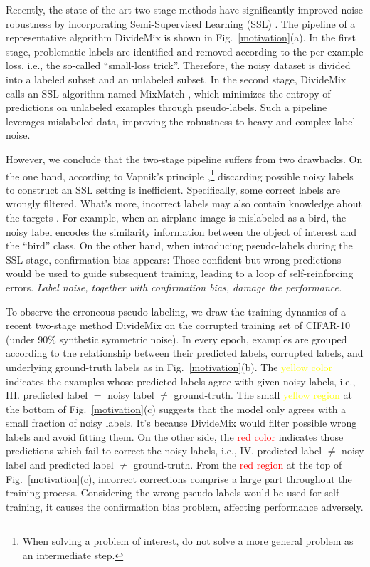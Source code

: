 \documentclass[letterpaper]{article} \usepackage{aaai23}  \usepackage{times}  \usepackage{helvet}  \usepackage{courier}  \usepackage[hyphens]{url}  \usepackage{graphicx} \urlstyle{rm} \def\UrlFont{\rm}  \usepackage{natbib}  \usepackage{caption} \frenchspacing  \setlength{\pdfpagewidth}{8.5in} \setlength{\pdfpageheight}{11in} \usepackage{algorithm}
\begin{document}
Recently, the state-of-the-art two-stage methods have significantly improved noise robustness by incorporating Semi-Supervised Learning (SSL) \cite{ding2018semi,nguyen2019self,li2020dividemix,zhou2021robust}.
The pipeline of a representative algorithm DivideMix \cite{li2020dividemix} is shown in Fig.~\ref{motivation}(a). 
In the first stage, problematic labels are identified and removed according to the per-example loss, i.e., the so-called  ``small-loss trick''.
Therefore, the noisy dataset is divided into a labeled subset and an unlabeled subset. 
In the second stage, DivideMix calls an SSL algorithm named MixMatch \cite{berthelot2019mixmatch}, which minimizes the entropy of predictions on unlabeled examples through pseudo-labels.
Such a pipeline leverages mislabeled data, improving the robustness to heavy and complex label noise.

However, we conclude that the two-stage pipeline suffers from two drawbacks.
On the one hand, according to Vapnik's principle \cite{Vapnik1998,Chapelle2006},\footnote{When solving a problem of interest, do not solve a more general problem as an intermediate step.} discarding possible noisy labels to construct an SSL setting is inefficient. 
Specifically, some correct labels are wrongly filtered. What's more, incorrect labels may also contain knowledge about the targets \cite{yu2018learning,ishida2017learning,kim2019nlnl,berthon2021confidence}.
For example, when an airplane image is mislabeled as a bird, the noisy label encodes the similarity information between the object of interest and the ``bird'' class.
On the other hand, when introducing pseudo-labels during the SSL stage, confirmation bias \cite{tarvainen2017mean,arazo2020pseudo} appears:
Those confident but wrong predictions would be used to guide subsequent training, leading to a loop of self-reinforcing errors.
\emph{Label noise, together with confirmation bias, damage the performance.}

To observe the erroneous pseudo-labeling, we draw the training dynamics of a recent two-stage method DivideMix \cite{li2020dividemix} on the corrupted training set of CIFAR-10 \cite{krizhevsky2009learning} (under 90\% synthetic symmetric noise).
In every epoch, examples are grouped according to the relationship between their predicted labels, corrupted labels, and underlying ground-truth labels as in Fig.~\ref{motivation}(b).
The \textcolor{yellow}{yellow color} indicates the examples whose predicted labels agree with given noisy labels, i.e., III. predicted label $=$ noisy label $\neq$ ground-truth.
The small \textcolor{yellow}{yellow region} at the bottom of Fig.~\ref{motivation}(c) suggests that the model only agrees with a small fraction of noisy labels.
It's because DivideMix would filter possible wrong labels and avoid fitting them.
On the other side, the \textcolor{red}{red color} indicates those predictions which fail to correct the noisy labels, i.e., IV. predicted label $\neq$ noisy label and predicted label $\neq$ ground-truth.
From the \textcolor{red}{red region} at the top of Fig.~\ref{motivation}(c), incorrect corrections comprise a large part throughout the training process.
Considering the wrong pseudo-labels would be used for self-training, it causes the confirmation bias problem, affecting performance adversely.
\end{document}
